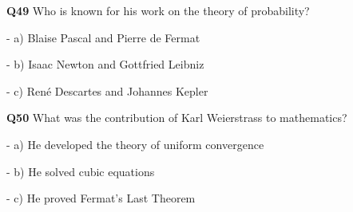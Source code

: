 \textbf{Q49} Who is known for his work on the theory of probability?\par
\quad - a) Blaise Pascal and Pierre de Fermat\par
\quad - b) Isaac Newton and Gottfried Leibniz\par
\quad - c) René Descartes and Johannes Kepler\par

\textbf{Q50} What was the contribution of Karl Weierstrass to mathematics?\par
\quad - a) He developed the theory of uniform convergence\par
\quad - b) He solved cubic equations\par
\quad - c) He proved Fermat's Last Theorem\par